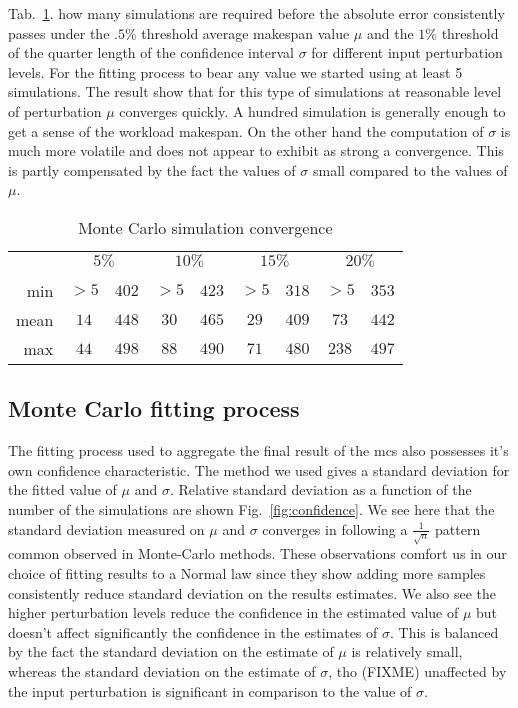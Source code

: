 \documentclass[10pt,conference,compsocconf]{IEEEtran}
\newcommand*\rot{\rotatebox{90}}
\begin{document}
Tab.~\ref{tab:mcs-convergence}. how many simulations are required before the
absolute error consistently passes under the $.5\%$ threshold average makespan
value $\mu$ and the $1\%$ threshold of the quarter length of the confidence
interval $\sigma$ for different input perturbation levels. For the fitting
process to bear any value we started using at least 5 simulations. The result
show that for this type of simulations at reasonable level of perturbation $\mu$
converges quickly. A hundred simulation is generally enough to get a sense of
the workload makespan. On the other hand the computation of $\sigma$ is much
more volatile and does not appear to exhibit  as strong a convergence. This is
partly compensated by the fact the values of $\sigma$ small compared to the
values of $\mu$.

\begin{table}
	\centering
	\begin{tabular}{|r|cc|cc|cc|cc|}
		\cline{2-9}
		\multicolumn{1}{c|}{}& \multicolumn{2}{c|}{$5\%$}& \multicolumn{2}{c|}{$10\%$}&\multicolumn{2}{c|}{$15\%$}& \multicolumn{2}{c|}{$20\%$}\\
		\multicolumn{1}{c|}{}&\rot{$\mu.ae<.5\%$}&\rot{$\sigma.ae<1\%$}&\rot{$\mu.ae<.5\%$}&\rot{$\sigma.ae<1\%$}&\rot{$\mu.ae<.5\%$}&\rot{$\sigma.ae<1\%$}&\rot{$\mu.ae<.5\%$}&\rot{$\sigma.ae<1\%$}\\
		\hline
		min&$>5$&$402$&$>5$&$423$&$>5$&$318$&$>5$&$353$\\
		mean&$14$&$448$&$30$&$465$&$29$&$409$&$73$&$442$\\
		max&$44$&$498$&$88$&$490$&$71$&$480$&$238$&$497$\\
		\hline
	\end{tabular}
	\caption{Monte Carlo simulation convergence}
	\label{tab:mcs-convergence}
\end{table}

\subsection{Monte Carlo fitting process}

The fitting process used to aggregate the final result of the \ac{mcs} also 
possesses it's own confidence characteristic. The method we used
gives a standard deviation for the fitted value of $\mu$ and $\sigma$. Relative
standard deviation as a function of the number of the simulations are shown
Fig.~\ref{fig:confidence}. We see here that the standard deviation measured on
$\mu$ and $\sigma$ converges in following a $\frac{1}{\sqrt{n}}$ pattern
common observed in Monte-Carlo methods. These observations comfort us in our
choice of fitting results to a Normal law since they show adding more samples
consistently reduce standard deviation on the results estimates. We also see the
higher perturbation levels reduce the confidence in the estimated value of $\mu$
but doesn't affect significantly the confidence in the estimates of $\sigma$.
This is balanced by the fact the standard deviation on the estimate of $\mu$
is relatively small, whereas the standard deviation on the estimate of
$\sigma$, tho (FIXME) unaffected by the input perturbation is significant in comparison
to the value of $\sigma$.
\end{document}
